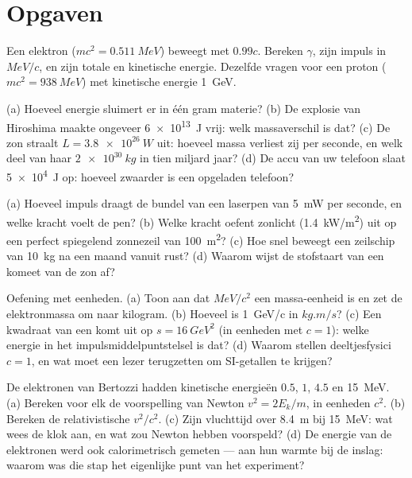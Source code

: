 \section{Opgaven}

\begin{exercise}[$\star$]\label{exo:b3:relativistic-dynamics:1}
Een elektron ($mc^2 = \qty{0.511}{MeV}$) beweegt met $0.99c$. Bereken
$\gamma$, zijn impuls in $\unit{MeV}/c$, en zijn totale en kinetische
energie. Dezelfde vragen voor een proton ($mc^2 = \qty{938}{MeV}$) met
kinetische energie \qty{1}{GeV}.
\end{exercise}

\begin{exercise}[$\star$]\label{exo:b3:relativistic-dynamics:2}
(a) Hoeveel energie sluimert er in één gram materie? (b) De explosie van
Hiroshima maakte ongeveer \qty{6e13}{J} vrij: welk massaverschil is dat?
(c) De zon straalt $L = \qty{3.8e26}{W}$ uit: hoeveel massa verliest zij
per seconde, en welk deel van haar $\qty{2e30}{kg}$ in tien miljard jaar?
(d) De accu van uw telefoon slaat \qty{5e4}{J} op: hoeveel zwaarder is
een opgeladen telefoon?
\end{exercise}

\begin{exercise}[$\star$]\label{exo:b3:relativistic-dynamics:3}
(a) Hoeveel impuls draagt de bundel van een laserpen van \qty{5}{mW} per
seconde, en welke kracht voelt de pen? (b) Welke kracht oefent zonlicht
(\qty{1.4}{kW/m^2}) uit op een perfect spiegelend zonnezeil van
\qty{100}{m^2}? (c) Hoe snel beweegt een zeilschip van \qty{10}{kg} na
een maand vanuit rust? (d) Waarom wijst de stofstaart van een komeet van
de zon af?
\end{exercise}

\begin{exercise}[$\star$]\label{exo:b3:relativistic-dynamics:4}
Oefening met eenheden. (a) Toon aan dat $\unit{MeV}/c^2$ een
massa-eenheid is en zet de elektronmassa om naar kilogram. (b) Hoeveel is
\qty{1}{GeV/c} in $\unit{kg.m/s}$? (c) Een kwadraat van een  komt uit op $s = \qty{16}{GeV^2}$ (in eenheden met $c = 1$): welke
energie in het impulsmiddelpuntstelsel is dat? (d) Waarom stellen
deeltjesfysici $c = 1$, en wat moet een lezer terugzetten om
SI-getallen te krijgen?
\end{exercise}

\begin{exercise}[$\star\star$]\label{exo:b3:relativistic-dynamics:5}
De elektronen van Bertozzi hadden kinetische energieën $0.5$, $1$, $4.5$
en \qty{15}{MeV}. (a) Bereken voor elk de voorspelling van Newton $v^2 = 2E_k/m$, in eenheden $c^2$. (b) Bereken de relativistische $v^2/c^2$. (c)
Zijn vluchttijd over \qty{8.4}{m} bij \qty{15}{MeV}: wat wees de klok
aan, en wat zou Newton hebben voorspeld? (d) De energie van de elektronen
werd ook calorimetrisch gemeten --- aan hun warmte bij de inslag: waarom
was die stap het eigenlijke punt van het experiment?
\end{exercise}

